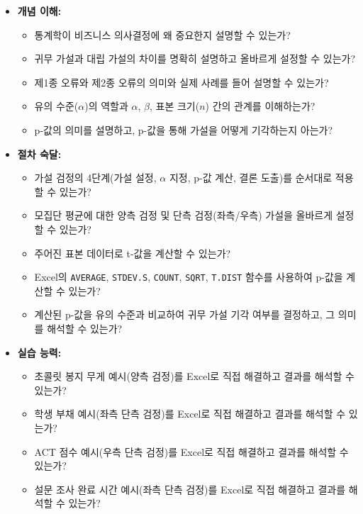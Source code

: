 \documentclass[11pt,a4paper]{book}
\theoremstyle{definition}
\begin{document}
\begin{itemize}
    \item \textbf{개념 이해:}
    \begin{itemize}
        \item 통계학이 비즈니스 의사결정에 왜 중요한지 설명할 수 있는가?
        \item 귀무 가설과 대립 가설의 차이를 명확히 설명하고 올바르게 설정할 수 있는가?
        \item 제1종 오류와 제2종 오류의 의미와 실제 사례를 들어 설명할 수 있는가?
        \item 유의 수준($\alpha$)의 역할과 $\alpha$, $\beta$, 표본 크기($n$) 간의 관계를 이해하는가?
        \item p-값의 의미를 설명하고, p-값을 통해 가설을 어떻게 기각하는지 아는가?
    \end{itemize}
    \item \textbf{절차 숙달:}
    \begin{itemize}
        \item 가설 검정의 4단계(가설 설정, $\alpha$ 지정, p-값 계산, 결론 도출)를 순서대로 적용할 수 있는가?
        \item 모집단 평균에 대한 양측 검정 및 단측 검정(좌측/우측) 가설을 올바르게 설정할 수 있는가?
        \item 주어진 표본 데이터로 t-값을 계산할 수 있는가?
        \item Excel의 \texttt{AVERAGE}, \texttt{STDEV.S}, \texttt{COUNT}, \texttt{SQRT}, \texttt{T.DIST} 함수를 사용하여 p-값을 계산할 수 있는가?
        \item 계산된 p-값을 유의 수준과 비교하여 귀무 가설 기각 여부를 결정하고, 그 의미를 해석할 수 있는가?
    \end{itemize}
    \item \textbf{실습 능력:}
    \begin{itemize}
        \item 초콜릿 봉지 무게 예시(양측 검정)를 Excel로 직접 해결하고 결과를 해석할 수 있는가?
        \item 학생 부채 예시(좌측 단측 검정)를 Excel로 직접 해결하고 결과를 해석할 수 있는가?
        \item ACT 점수 예시(우측 단측 검정)를 Excel로 직접 해결하고 결과를 해석할 수 있는가?
        \item 설문 조사 완료 시간 예시(좌측 단측 검정)를 Excel로 직접 해결하고 결과를 해석할 수 있는가?
    \end{itemize}
\end{itemize}
\end{document}

